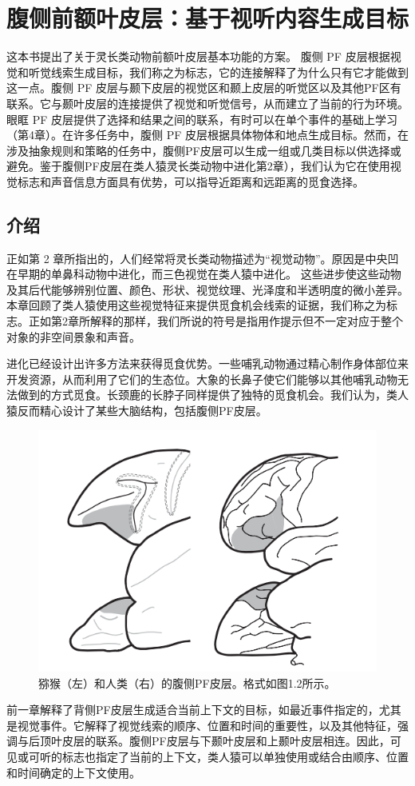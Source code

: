 \chapter{腹侧前额叶皮层：基于视听内容生成目标}
这本书提出了关于灵长类动物前额叶皮层基本功能的方案。
腹侧 PF 皮层根据视觉和听觉线索生成目标，我们称之为标志，它的连接解释了为什么只有它才能做到这一点。腹侧 PF 皮层与颞下皮层的视觉区和颞上皮层的听觉区以及其他PF区有联系。它与颞叶皮层的连接提供了视觉和听觉信号，从而建立了当前的行为环境。眼眶 PF 皮层提供了选择和结果之间的联系，有时可以在单个事件的基础上学习（第4章）。在许多任务中，腹侧 PF 皮层根据具体物体和地点生成目标。然而，在涉及抽象规则和策略的任务中，腹侧PF皮层可以生成一组或几类目标以供选择或避免。鉴于腹侧PF皮层在类人猿灵长类动物中进化第2章），我们认为它在使用视觉标志和声音信息方面具有优势，可以指导近距离和远距离的觅食选择。
\section{介绍}
\par
正如第 2 章所指出的，人们经常将灵长类动物描述为“视觉动物”。原因是中央凹在早期的单鼻科动物中进化，而三色视觉在类人猿中进化。 这些进步使这些动物及其后代能够辨别位置、颜色、形状、视觉纹理、光泽度和半透明度的微小差异。本章回顾了类人猿使用这些视觉特征来提供觅食机会线索的证据，我们称之为标志。正如第2章所解释的那样，我们所说的符号是指用作提示但不一定对应于整个对象的非空间景象和声音。
\par
进化已经设计出许多方法来获得觅食优势。一些哺乳动物通过精心制作身体部位来开发资源，从而利用了它们的生态位。大象的长鼻子使它们能够以其他哺乳动物无法做到的方式觅食。长颈鹿的长脖子同样提供了独特的觅食机会。我们认为，类人猿反而精心设计了某些大脑结构，包括腹侧PF皮层。
\begin{figure}
	\centering
	\includegraphics[width=0.7\linewidth]{image_pfc/Fig_7_1}
	\caption{猕猴（左）和人类（右）的腹侧PF皮层。格式如图1.2所示。}
	\label{fig:fig}
\end{figure}
\par
前一章解释了背侧PF皮层生成适合当前上下文的目标，如最近事件指定的，尤其是视觉事件。它解释了视觉线索的顺序、位置和时间的重要性，以及其他特征，强调与后顶叶皮层的联系。腹侧PF皮层与下颞叶皮层和上颞叶皮层相连。因此，可见或可听的标志也指定了当前的上下文，类人猿可以单独使用或结合由顺序、位置和时间确定的上下文使用。
